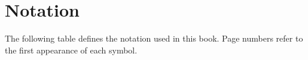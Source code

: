 \chapter*{Notation}


The following table defines the  notation used in this book. Page numbers
refer to the first appearance of each symbol.
%
